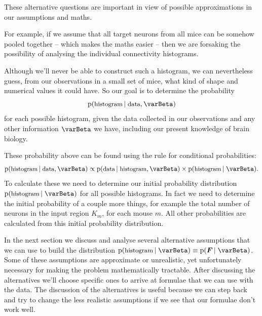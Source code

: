 \documentclass[\ifafour a4paper,12pt,\else a5paper,10pt,\fi%
onecolumn,oneside,article,%
british%
]{memoir}
\theoremstyle{remark}
\theoremstyle{innote}
\newcommand*{\pf}{\mathrm{p}}%
\renewcommand*{\|}[1][]{\nonscript\,#1\vert\nonscript\;\mathopen{}}
\newcommand*{\yI}{\varBeta}
\newcommand*{\yF}{\bm{F}}
\begin{document}
\medskip

These alternative questions are important in view of possible
approximations in our assumptions and maths.



For example, if we assume that
all target neurons from all mice can be somehow pooled together -- which
makes the maths easier -- then we are forsaking the possibility of
analysing the individual connectivity histograms.

\medskip

Although we'll never be able to construct such a histogram, we can
nevertheless guess, from our observations in a small set of mice, what kind
of shape and numerical values it could have. So our goal is to determine
the probability
\begin{equation}
  \label{eq:prob_histogram_general}
  \pf(\text{\small histogram} \| \text{\small data}, \yI)
\end{equation}
for each possible histogram, given the data collected in our observations
and any other information $\yI$ we have, including our present knowledge of
brain biology.

These probability above can be found using the rule for conditional
probabilities:
\begin{equation}
  \label{eq:prob_histogram_bayes}
  \pf(\text{\small histogram} \| \text{\small data}, \yI)
  \propto
  \pf(\text{\small data} \| \text{\small histogram}, \yI)
  \times
  \pf(\text{\small histogram} \|  \yI).
\end{equation}
To calculate these we need to determine our initial probability
distribution $\pf(\text{\small histogram} \| \yI)$ for all possible
histograms. In fact we need to determine the initial probability of a
couple more things, for example the total number of neurons in the input
region $K_{m}$, for each mouse $m$. All other probabilities are calculated
from this initial probability distribution.

In the next section we discuss and analyse several alternative assumptions
that we can use to build the distribution
$\pf(\text{\small histogram} \| \yI) \equiv \pf(\yF \| \yI)$. Some of these
assumptions are approximate or unrealistic, yet unfortunately necessary for
making the problem mathematically tractable. After discussing the
alternatives we'll choose specific ones to arrive at formulae that we can
use with the data. The discussion of the alternatives is useful because we
can step back and try to change the less realistic assumptions if we see
that our formulae don't work well.
\end{document}
